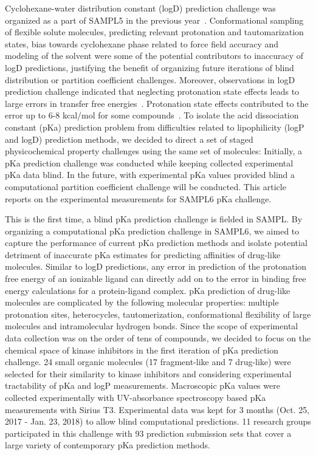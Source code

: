 \documentclass[9pt,lineno]{elife}
\begin{document}
Cyclohexane-water distribution constant (logD) prediction challenge was organized as a part of SAMPL5 in the previous year~\citep{bannan_blind_2016,rustenburg_measuring_2016}. Conformational sampling of flexible solute molecules, predicting relevant protonation and tautomarization states, bias towards cyclohexane phase related to force field accuracy and modeling of the solvent were some of the potential contributors to inaccuracy of logD predictions, justifying the benefit of organizing future iterations of blind distribution or partition coefficient challenges.  Moreover, observations in logD prediction challenge indicated that neglecting protonation state effects leads to large errors in transfer free energies~\citep{bannan_blind_2016, pickard_blind_2016,rustenburg_measuring_2016}. Protonation state effects contributed to the error up to 6-8 kcal/mol for some compounds~\citep{pickard_blind_2016}.  To isolate the acid dissociation constant (pKa) prediction problem from difficulties related to lipophilicity (logP and logD) prediction methods, we decided to direct a set of staged physicochemical property challenges using the same set of molecules: Initially, a pKa prediction challenge was conducted while keeping collected experimental pKa data blind. In the future, with experimental pKa values provided blind a computational partition coefficient challenge will be conducted. This article reports on the experimental measurements for SAMPL6 pKa challenge.

This is the first time, a blind pKa prediction challenge is fielded in SAMPL. By organizing a computational pKa prediction challenge in SAMPL6, we aimed to capture the performance of current pKa prediction methods and isolate potential detriment of inaccurate pKa estimates for predicting affinities of drug-like molecules. Similar to logD predictions, any error in prediction of the protonation free energy of an ionizable ligand can directly add on to the error in binding free energy calculations for a protein-ligand complex. pKa prediction of drug-like molecules are complicated by the following molecular properties: multiple protonation sites, heterocycles, tautomerization, conformational flexibility of large molecules and intramolecular hydrogen bonds. Since the scope of experimental data collection was on the order of tens of compounds, we decided to focus on the chemical space of kinase inhibitors in the first iteration of pKa prediction challenge. 24 small organic molecules (17 fragment-like and 7 drug-like) were selected for their similarity to kinase inhibitors and considering experimental tractability of pKa and logP measurements. Macroscopic pKa values were collected experimentally with UV-absorbance spectroscopy based pKa measurements with Sirius T3. Experimental data was kept for 3 months (Oct. 25, 2017 - Jan. 23, 2018) to allow blind computational predictions. 11 research groups participated in this challenge with 93 prediction submission sets that cover a large variety of contemporary pKa prediction methods. 
 
\end{document}
